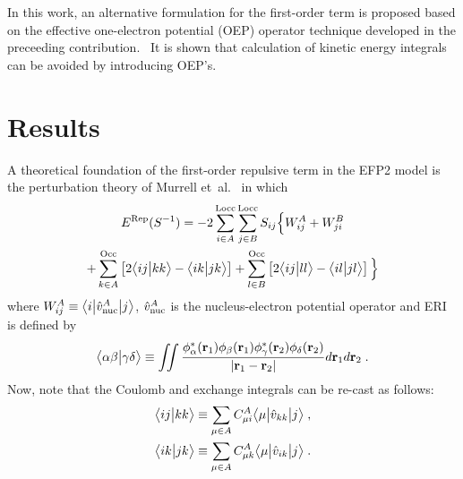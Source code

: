 In this work, an alternative formulation for the first\hyp{}order
term is proposed based on the effective one\hyp{}electron potential (OEP)
operator technique developed in the preceeding contribution.~\cite{Blasiak.Bednarska.Choluj.Bartkowiak.JCP.2019}
It is shown that calculation of kinetic energy integrals can be avoided
by introducing OEP's.

\section{Results}

A theoretical foundation of the
first\hyp{}order repulsive term in the EFP2 model
is the perturbation theory of
Murrell et~al.~\cite{Murrell.Randic.Williams.Longuet-Higgins.ProcRSocLondA.1965} 
in which
%
\begin{multline} \label{e:rep.murrell-etal.S1}
    E^{\rm Rep}(S^{-1}) = -2\sum_{i\in A}^{\rm Locc} \sum_{j\in B}^{\rm Locc}
               S_{ij} \Big\{
           W^A_{ij} 
         + W^B_{ji} \\
 + \sum_{k\in A}^{\rm Occ} \left[ 2\bigl\langle {ij} \bigl\lvert {kk} \bigr\rangle - \bigl\langle {ik} \bigl\lvert {jk} \bigr\rangle \right] 
 + \sum_{l\in B}^{\rm Occ} \left[ 2\bigl\langle {ij} \bigl\lvert {ll} \bigr\rangle - \bigl\langle {il} \bigl\lvert {jl} \bigr\rangle \right]
                \Big\}
\end{multline}
%
where $W^A_{ij} \equiv \bigl\langle {i} \bigl\lvert {\hat{v}^A_{\rm nuc}} \bigl\lvert {j} \bigr\rangle$,
$\hat{v}^A_{\rm nuc}$
is the nucleus\hyp{}electron potential operator
and
ERI is defined by
%
\begin{equation} \label{e:eri}
	\bigl\langle {\alpha\beta} \bigl\lvert {\gamma\delta} \bigr\rangle \equiv
	\iint 
	\frac{ \phi_\alpha^{*}({\bf r}_1) \phi_\beta({\bf r}_1) 
	       \phi_\gamma^{*}({\bf r}_2) \phi_\delta({\bf r}_2) }{ \vert {\bf r}_1 - {\bf r}_2 \vert}
	d{\bf r}_1 d{\bf r}_2  \;.
\end{equation}
%
Now, note that the Coulomb and exchange integrals can be re\hyp{}cast as follows:
%
\begin{subequations}
 \begin{align}
 \bigl\langle {ij} \bigl\lvert {kk} \bigr\rangle &\equiv \sum_{\mu\in A} 
     C_{\mu i}^A \bigl\langle {\mu} \bigl\lvert {\hat{v}_{kk}} \bigl\lvert {j} \bigr\rangle \;, \\
 \bigl\langle {ik} \bigl\lvert {jk} \bigr\rangle &\equiv \sum_{\mu\in A} 
     C_{\mu k}^A \bigl\langle {\mu} \bigl\lvert {\hat{v}_{ik}} \bigl\lvert {j} \bigr\rangle \;.
 \end{align}
\end{subequations}
%
%
